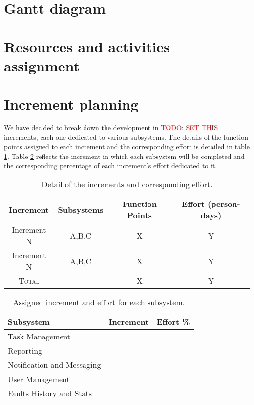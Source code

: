

\section{Gantt diagram}

\section{Resources and activities assignment}

\section{Increment planning}

We have decided to break down the development in \textcolor{red}{TODO: SET THIS} increments, each one dedicated to various subsystems. The details of the function points assigned to each increment and the corresponding effort is detailed in table \ref{tblIncrementsSubsystems}. Table \ref{tblSubsystemsAssignedIncrement} reflects the increment in which each subsystem will be completed and the corresponding percentage of each increment's effort dedicated to it.

\begin{table}[hbtp]
\centering
\begin{tabular}{c|c|c|c}
\textbf{Increment} & \textbf{Subsystems} & \textbf{Function Points} & \textbf{Effort (person-days)} \\ \hline
Increment N & A,B,C & X & Y \\
Increment N & A,B,C & X & Y \\ \hline
\textsc{Total} & & X & Y \\
\end{tabular}
\caption{Detail of the increments and corresponding effort.}
\label{tblIncrementsSubsystems}
\end{table}

\begin{table}[hbtp]
\centering
\begin{tabular}{l|c|c}
\textbf{Subsystem} & \textbf{Increment} & \textbf{Effort \%}  \\ \hline
Task Management & & \\
Reporting & & \\
Notification and Messaging & & \\
User Management & & \\
Faults History and Stats & & \\
\end{tabular}
\caption{Assigned increment and effort for each subsystem.}
\label{tblSubsystemsAssignedIncrement}
\end{table}

